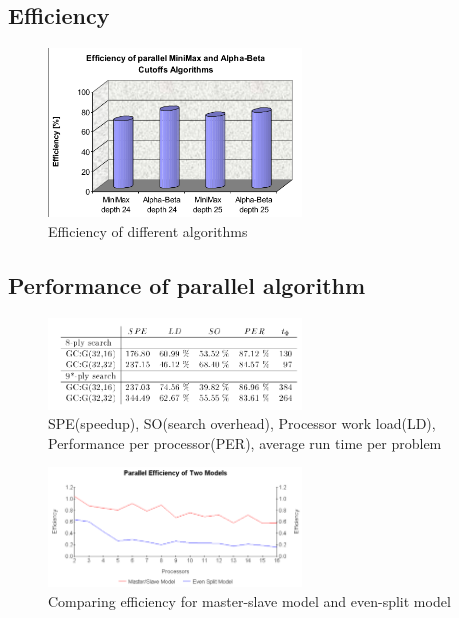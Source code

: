 \documentclass[12pt]{article}
\begin{document}
\subsection{Efficiency}

\begin{figure}[H]
  \centering
  \includegraphics[width=0.6\textwidth, height=0.4\textwidth]{efficiency.png}
  \caption{Efficiency of different algorithms}
\end{figure}

\subsection{Performance of parallel algorithm}

\begin{figure}[H]
  \centering
  \includegraphics[width=0.6\textwidth, height=0.4\textwidth]{parallel_measure.png}
  \caption{SPE(speedup), SO(search overhead), Processor work load(LD),
    Performance per processor(PER), average run time per problem}
\end{figure}

\begin{figure}[H]
  \centering
  \includegraphics[width=0.6\textwidth, height=0.4\textwidth]{efficiency_model.png}
  \caption{Comparing efficiency for master-slave model and even-split model}
\end{figure}
\end{document}
